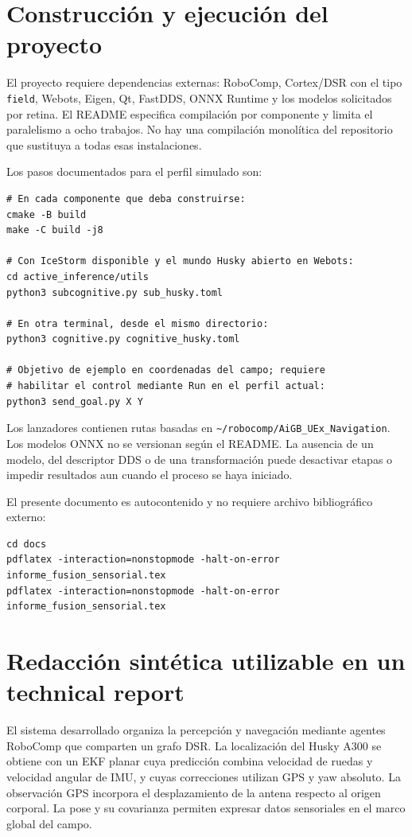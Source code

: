 \documentclass[11pt,a4paper]{article}
\newcommand{\code}[1]{\nolinkurl{#1}}
\newcommand{\file}[1]{\nolinkurl{#1}}
\begin{document}
\section{Construcción y ejecución del proyecto}
El proyecto requiere dependencias externas: RoboComp, Cortex/DSR con el tipo
\code{field}, Webots, Eigen, Qt, FastDDS, ONNX Runtime y los modelos solicitados por
retina. El README especifica compilación por componente y limita el paralelismo a
ocho trabajos. No hay una compilación monolítica del repositorio que sustituya a
todas esas instalaciones.~\cite{readme}

Los pasos documentados para el perfil simulado son:
\begin{lstlisting}
# En cada componente que deba construirse:
cmake -B build
make -C build -j8

# Con IceStorm disponible y el mundo Husky abierto en Webots:
cd active_inference/utils
python3 subcognitive.py sub_husky.toml

# En otra terminal, desde el mismo directorio:
python3 cognitive.py cognitive_husky.toml

# Objetivo de ejemplo en coordenadas del campo; requiere
# habilitar el control mediante Run en el perfil actual:
python3 send_goal.py X Y
\end{lstlisting}
Los lanzadores contienen rutas basadas en
\file{~/robocomp/AiGB_UEx_Navigation}. Los modelos ONNX no se versionan según el
README. La ausencia de un modelo, del descriptor DDS o de una transformación puede
desactivar etapas o impedir resultados aun cuando el proceso se haya iniciado.
\cite{launchsub,launchcog,readme,posestage}

El presente documento es autocontenido y no requiere archivo bibliográfico externo:
\begin{lstlisting}
cd docs
pdflatex -interaction=nonstopmode -halt-on-error informe_fusion_sensorial.tex
pdflatex -interaction=nonstopmode -halt-on-error informe_fusion_sensorial.tex
\end{lstlisting}

\section{Redacción sintética utilizable en un technical report}
El sistema desarrollado organiza la percepción y navegación mediante agentes
RoboComp que comparten un grafo DSR. La localización del Husky A300 se obtiene con
un EKF planar cuya predicción combina velocidad de ruedas y velocidad angular de
IMU, y cuyas correcciones utilizan GPS y yaw absoluto. La observación GPS incorpora
el desplazamiento de la antena respecto al origen corporal. La pose y su covarianza
permiten expresar datos sensoriales en el marco global del campo.
\end{document}
